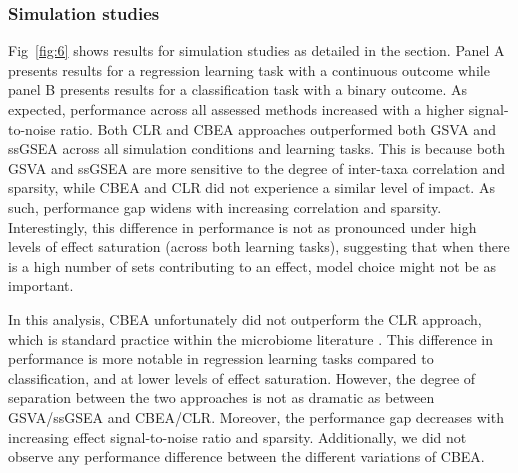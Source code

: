 \documentclass[10pt,letterpaper]{article}
\begin{document}
\subsubsection*{Simulation studies}
Fig~\ref{fig:6} shows results for simulation studies as detailed in the  section. Panel A presents results for a regression learning task with a continuous outcome while panel B presents results for a classification task with a binary outcome. As expected, performance across all assessed methods increased with a higher signal-to-noise ratio. Both CLR and CBEA approaches outperformed both GSVA and ssGSEA across all simulation conditions and learning tasks. This is because both GSVA and ssGSEA are more sensitive to the degree of inter-taxa correlation and sparsity, while CBEA and CLR did not experience a similar level of impact. As such, performance gap widens with increasing correlation and sparsity. Interestingly, this difference in performance is not as pronounced under high levels of effect saturation (across both learning tasks), suggesting that when there is a high number of sets contributing to an effect, model choice might not be as important.   

In this analysis, CBEA unfortunately did not outperform the CLR approach, which is standard practice within the microbiome literature \cite{gloor2017}. This difference in performance is more notable in regression learning tasks compared to classification, and at lower levels of effect saturation. However, the degree of separation between the two approaches is not as dramatic as between GSVA/ssGSEA and CBEA/CLR. Moreover, the performance gap decreases with increasing effect signal-to-noise ratio and sparsity. Additionally, we did not observe any performance difference between the different variations of CBEA. 
\end{document}
